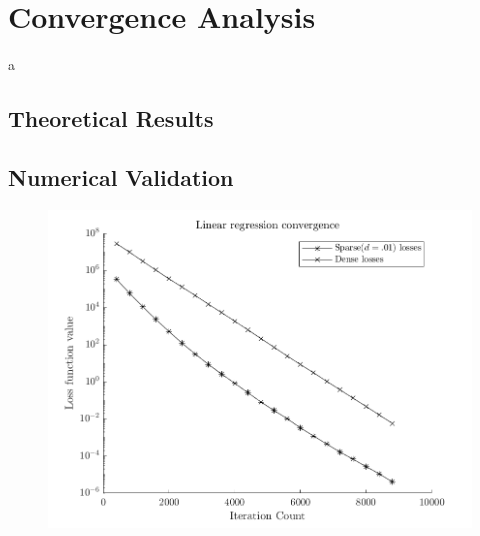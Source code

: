 \section{Convergence Analysis}
a
\subsection{Theoretical Results}
\subsection{Numerical Validation}
\begin{figure}[!htb]
  \centering
  \includegraphics[width=.8\textwidth]{./resources/convergence}
\end{figure}
